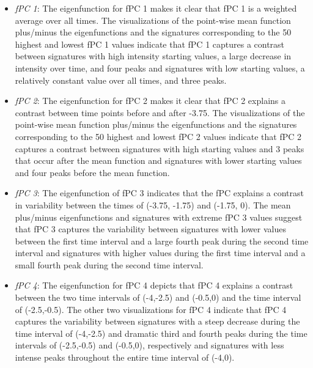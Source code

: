 \documentclass[letterpaper]{article}
\begin{document}
\begin{itemize}
\item \textit{fPC 1}: The eigenfunction for fPC 1 makes it clear that fPC 1 is a weighted average over all times. The visualizations of the point-wise mean function plus/minus the eigenfunctions and the signatures corresponding to the 50 highest and lowest fPC 1 values indicate that fPC 1 captures a contrast between signatures with high intensity starting values, a large decrease in intensity over time, and four peaks and signatures with low starting values, a relatively constant value over all times, and three peaks.
\item \textit{fPC 2}: The eigenfunction for fPC 2 makes it clear that fPC 2 explains a contrast between time points before and after -3.75. The visualizations of the point-wise mean function plus/minus the eigenfunctions and the signatures corresponding to the 50 highest and lowest fPC 2 values indicate that fPC 2 captures a contrast between signatures with high starting values and 3 peaks that occur after the mean function and signatures with lower starting values and four peaks before the mean function.
\item \textit{fPC 3}: The eigenfunction of fPC 3 indicates that the fPC explains a contrast in variability between the times of (-3.75, -1.75) and (-1.75, 0). The mean plus/minus eigenfunctions and signatures with extreme fPC 3 values suggest that fPC 3 captures the variability between signatures with lower values between the first time interval and a large fourth peak during the second time interval and signatures with higher values during the first time interval and a small fourth peak during the second time interval.
\item \textit{fPC 4}: The eigenfunction for fPC 4 depicts that fPC 4 explains a contrast between the two time intervals of (-4,-2.5) and (-0.5,0) and the time interval of (-2.5,-0.5). The other two visualizations for fPC 4 indicate that fPC 4 captures the variability between signatures with a steep decrease during the time interval of (-4,-2.5) and dramatic third and fourth peaks during the time intervals of (-2.5,-0.5) and (-0.5,0), respectively and signatures with less intense peaks throughout the entire time interval of (-4,0).
\end{itemize}
\end{document}
